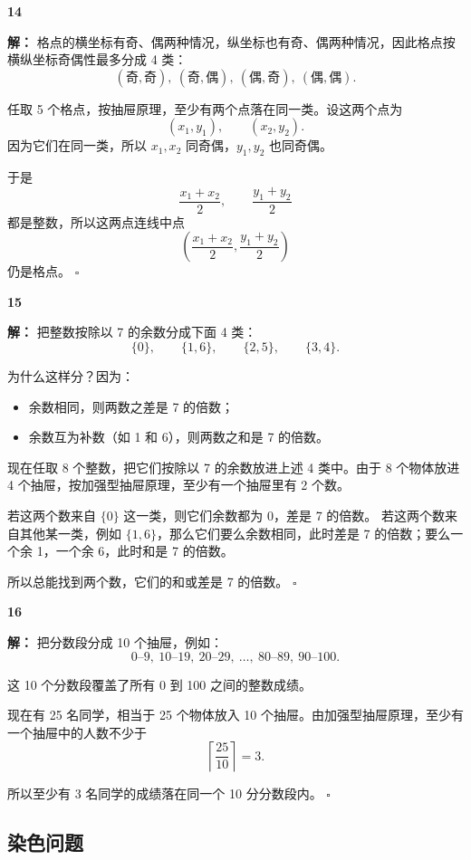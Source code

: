\documentclass[11pt,a4paper,fontset=fandol]{ctexart}
\theoremstyle{formalexample}
\newenvironment{solution}{\par\noindent\textbf{解：}}{\hfill$\square$\par}
\begin{document}
\textbf{14}\begin{solution}
格点的横坐标有奇、偶两种情况，纵坐标也有奇、偶两种情况，因此格点按横纵坐标奇偶性最多分成 4 类：
\[
(\text{奇},\text{奇}),\ (\text{奇},\text{偶}),\ (\text{偶},\text{奇}),\ (\text{偶},\text{偶}).
\]

任取 5 个格点，按抽屉原理，至少有两个点落在同一类。设这两个点为
\[
(x_1,y_1),\qquad (x_2,y_2).
\]
因为它们在同一类，所以 $x_1,x_2$ 同奇偶，$y_1,y_2$ 也同奇偶。

于是
\[
\frac{x_1+x_2}{2},\qquad \frac{y_1+y_2}{2}
\]
都是整数，所以这两点连线中点
\[
\left(\frac{x_1+x_2}{2},\frac{y_1+y_2}{2}\right)
\]
仍是格点。
\end{solution}

\textbf{15}\begin{solution}
把整数按除以 7 的余数分成下面 4 类：
\[
\{0\},\qquad \{1,6\},\qquad \{2,5\},\qquad \{3,4\}.
\]

为什么这样分？因为：
\begin{itemize}
  \item 余数相同，则两数之差是 7 的倍数；
  \item 余数互为补数（如 1 和 6），则两数之和是 7 的倍数。
\end{itemize}

现在任取 8 个整数，把它们按除以 7 的余数放进上述 4 类中。由于 8 个物体放进 4 个抽屉，按加强型抽屉原理，至少有一个抽屉里有 2 个数。

若这两个数来自 $\{0\}$ 这一类，则它们余数都为 0，差是 7 的倍数。  
若这两个数来自其他某一类，例如 $\{1,6\}$，那么它们要么余数相同，此时差是 7 的倍数；要么一个余 1，一个余 6，此时和是 7 的倍数。

所以总能找到两个数，它们的和或差是 7 的倍数。
\end{solution}

\textbf{16}\begin{solution}
把分数段分成 10 个抽屉，例如：
\[
0\text{--}9,\ 10\text{--}19,\ 20\text{--}29,\ \ldots,\ 80\text{--}89,\ 90\text{--}100.
\]

这 10 个分数段覆盖了所有 0 到 100 之间的整数成绩。

现在有 25 名同学，相当于 25 个物体放入 10 个抽屉。由加强型抽屉原理，至少有一个抽屉中的人数不少于
\[
\left\lceil \frac{25}{10}\right\rceil=3.
\]

所以至少有 3 名同学的成绩落在同一个 10 分分数段内。
\end{solution}

\subsection*{染色问题}
\end{document}
